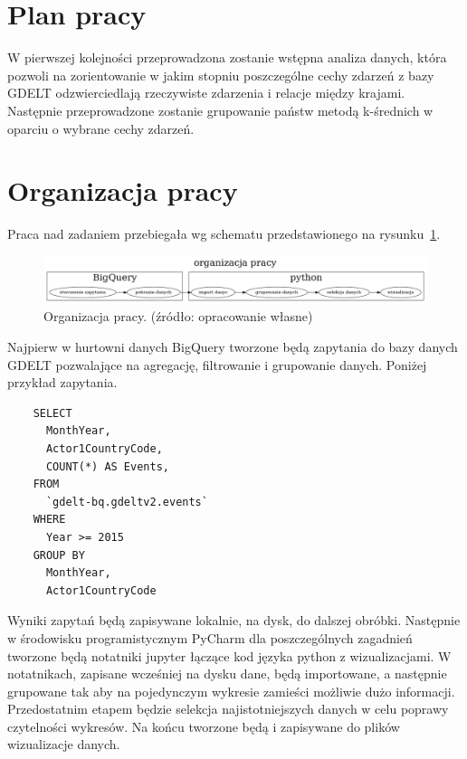 \documentclass[11pt]{report}
\begin{document}
    \section{Plan pracy}\label{sec:plan-pracy}

    W pierwszej kolejności przeprowadzona zostanie wstępna analiza danych, która pozwoli na zorientowanie w jakim stopniu poszczególne cechy zdarzeń z bazy GDELT odzwierciedlają rzeczywiste zdarzenia i relacje między krajami.
    Następnie przeprowadzone zostanie grupowanie państw metodą k-średnich w oparciu o wybrane cechy zdarzeń.


    \section{Organizacja pracy}\label{sec:organizacja-pracy}
    Praca nad zadaniem przebiegała wg schematu przedstawionego na rysunku~\ref{fig:organizacjia}.

    \begin{figure}[!htp]
        \centering
        \includegraphics[width=\linewidth]{fig/organizacja.png}
        \caption{Organizacja pracy. (źródło: opracowanie własne)}
        \label{fig:organizacjia}
    \end{figure}

    Najpierw w hurtowni danych BigQuery tworzone będą zapytania do bazy danych GDELT pozwalające na agregację, filtrowanie i grupowanie danych.
    Poniżej przykład zapytania.

    \begin{verbatim}
    SELECT
      MonthYear,
      Actor1CountryCode,
      COUNT(*) AS Events,
    FROM
      `gdelt-bq.gdeltv2.events`
    WHERE
      Year >= 2015
    GROUP BY
      MonthYear,
      Actor1CountryCode
    \end{verbatim}

    Wyniki zapytań będą zapisywane lokalnie, na dysk, do dalszej obróbki.
    Następnie w środowisku programistycznym PyCharm dla poszczególnych zagadnień tworzone będą notatniki jupyter łączące kod języka python z wizualizacjami.
    W notatnikach, zapisane wcześniej na dysku dane, będą importowane, a następnie grupowane tak aby na pojedynczym wykresie zamieści możliwie dużo informacji.
    Przedostatnim etapem będzie selekcja najistotniejszych danych w celu poprawy czytelności wykresów.
    Na końcu tworzone będą i zapisywane do plików wizualizacje danych.
\end{document}

